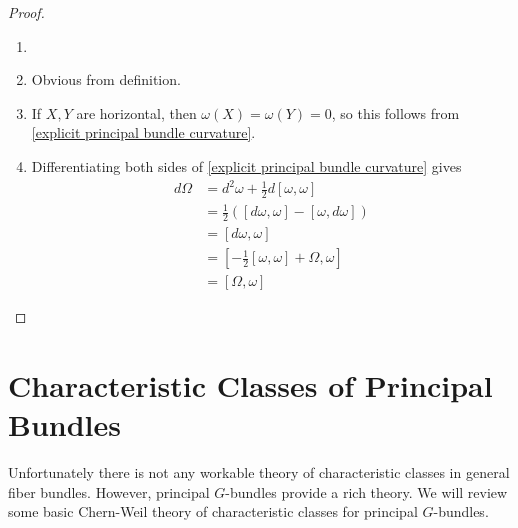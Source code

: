 \begin{proof}
\sloppyspace
\begin{enumerate}
	\item 
	\item Obvious from definition.
	\item If $X,Y$ are horizontal, then $\omega(X)=\omega(Y)=0$, so this follows from \eqref{explicit principal bundle curvature}.
	\item Differentiating both sides of \eqref{explicit principal bundle curvature} gives
	\begin{align*}
		d\Omega  &= d^2 \omega + \frac{1}{2} d[\omega,\omega] \\
					&= \frac{1}{2} \left( [d\omega,\omega] - [\omega,d\omega] \right) \\
					&= [d\omega,\omega] \\
					&= \left[ -\frac{1}{2} [\omega,\omega] + \Omega,\omega \right] \\
					&= [\Omega,\omega]
	\end{align*}
\end{enumerate}
\end{proof}







\section{Characteristic Classes of Principal Bundles}

Unfortunately there is not any workable theory of characteristic classes in general fiber bundles. However, principal $G$-bundles provide a rich theory. We will review some basic Chern-Weil theory of characteristic classes for principal $G$-bundles.



